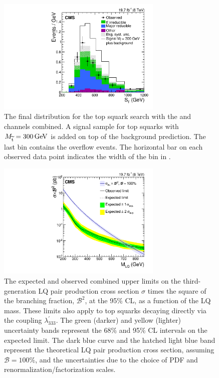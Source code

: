 \begin{figure}[htbp]
  \centering
    \includegraphics[width=0.7\textwidth]{figures/final/st_lqd321.pdf}
    \caption{The final \ST distribution for the top squark search with the \etau and \mutau channels combined.
             A signal sample for top squarks with $M_{\widetilde{\mathrm{t}}}=300\,\text{Ge\hspace{-.08em}V}$ is added on top of the background prediction.
             The last bin contains the overflow events. The horizontal bar on each observed data point indicates the width of the bin in \ST.
           }
    \label{Res:fig:STfinalLQD321}
\end{figure}

\begin{figure}[htbp]
  \centering
    \includegraphics[width=0.7\textwidth]{figures/final/BR_Sigma_TauTau_LQ.pdf}
    \caption{The expected and observed combined upper limits on the third-gen\-er\-a\-tion LQ pair production cross section $\sigma$ times the square of the branching fraction, $\mathcal{B}^2$, at the 95\% CL, as a function of the LQ mass. These limits also apply to top squarks decaying directly via the coupling $\lambda^{\prime}_{333}$. The green (darker) and yellow (lighter) uncertainty bands represent the 68\% and 95\% CL intervals on the expected limit. The dark blue curve and the hatched light blue band represent the theoretical LQ pair production cross section, assuming $\mathcal{B}=100\%$, and the uncertainties due to the choice of PDF and renormalization/factorization scales.}
    \label{Res:fig:asymptoticCombLQ}
\end{figure}

